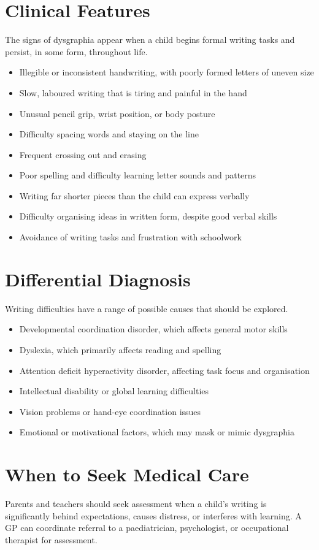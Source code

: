 \section*{Clinical Features}
The signs of dysgraphia appear when a child begins formal writing tasks and persist, in some form, throughout life.
\begin{itemize}
    \item Illegible or inconsistent handwriting, with poorly formed letters of uneven size
    \item Slow, laboured writing that is tiring and painful in the hand
    \item Unusual pencil grip, wrist position, or body posture
    \item Difficulty spacing words and staying on the line
    \item Frequent crossing out and erasing
    \item Poor spelling and difficulty learning letter sounds and patterns
    \item Writing far shorter pieces than the child can express verbally
    \item Difficulty organising ideas in written form, despite good verbal skills
    \item Avoidance of writing tasks and frustration with schoolwork
\end{itemize}

\section*{Differential Diagnosis}
Writing difficulties have a range of possible causes that should be explored.
\begin{itemize}
    \item Developmental coordination disorder, which affects general motor skills
    \item Dyslexia, which primarily affects reading and spelling
    \item Attention deficit hyperactivity disorder, affecting task focus and organisation
    \item Intellectual disability or global learning difficulties
    \item Vision problems or hand-eye coordination issues
    \item Emotional or motivational factors, which may mask or mimic dysgraphia
\end{itemize}

\section*{When to Seek Medical Care}
Parents and teachers should seek assessment when a child's writing is significantly behind expectations, causes distress, or interferes with learning. A GP can coordinate referral to a paediatrician, psychologist, or occupational therapist for assessment.

